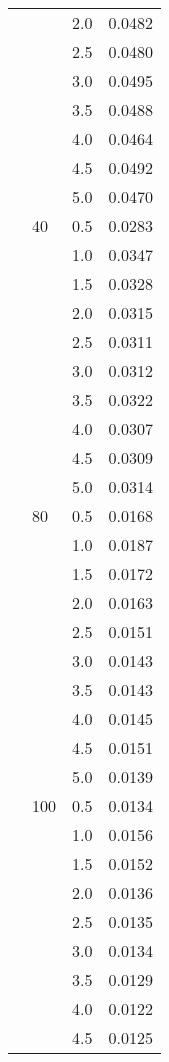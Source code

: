 \begin{tabular}{lllr}
          &     & 2.0 & 0.0482 \\
          &     & 2.5 & 0.0480 \\
          &     & 3.0 & 0.0495 \\
          &     & 3.5 & 0.0488 \\
          &     & 4.0 & 0.0464 \\
          &     & 4.5 & 0.0492 \\
          &     & 5.0 & 0.0470 \\
          & 40  & 0.5 & 0.0283 \\
          &     & 1.0 & 0.0347 \\
          &     & 1.5 & 0.0328 \\
          &     & 2.0 & 0.0315 \\
          &     & 2.5 & 0.0311 \\
          &     & 3.0 & 0.0312 \\
          &     & 3.5 & 0.0322 \\
          &     & 4.0 & 0.0307 \\
          &     & 4.5 & 0.0309 \\
          &     & 5.0 & 0.0314 \\
          & 80  & 0.5 & 0.0168 \\
          &     & 1.0 & 0.0187 \\
          &     & 1.5 & 0.0172 \\
          &     & 2.0 & 0.0163 \\
          &     & 2.5 & 0.0151 \\
          &     & 3.0 & 0.0143 \\
          &     & 3.5 & 0.0143 \\
          &     & 4.0 & 0.0145 \\
          &     & 4.5 & 0.0151 \\
          &     & 5.0 & 0.0139 \\
          & 100 & 0.5 & 0.0134 \\
          &     & 1.0 & 0.0156 \\
          &     & 1.5 & 0.0152 \\
          &     & 2.0 & 0.0136 \\
          &     & 2.5 & 0.0135 \\
          &     & 3.0 & 0.0134 \\
          &     & 3.5 & 0.0129 \\
          &     & 4.0 & 0.0122 \\
          &     & 4.5 & 0.0125 \\

\end{tabular}
